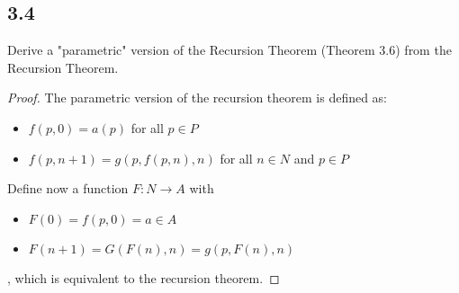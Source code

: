 \subsection*{3.4} Derive a "parametric" version of the Recursion Theorem (Theorem 3.6) from the Recursion Theorem.

\begin{proof}

The parametric version of the recursion theorem is defined as:

\begin{itemize}
    \item $f(p, 0) = a(p)$ for all $p \in P$
    \item $f(p, n+1) = g(p, f(p,n), n)$ for all $n \in N$ and $p \in P$
\end{itemize}

Define now a function $F: N \rightarrow A$ with

\begin{itemize}
    \item $F(0) = f(p, 0) = a \in A$
    \item $F(n+1) = G(F(n), n) = g(p, F(n), n)$
\end{itemize}

, which is equivalent to the recursion theorem.

\end{proof}

